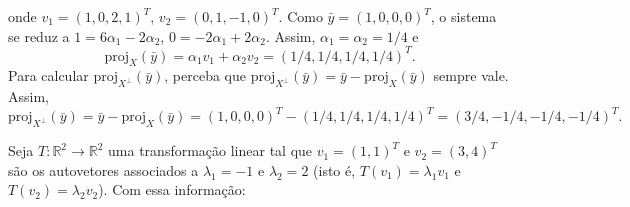\documentclass[11pt]{exam}
\begin{document}
\begin{questions}
\begin{parts}
\begin{solution}
         onde $v_1=(1, 0, 2, 1)^{T}$, $v_2=(0, 1, -1, 0)^{T}$.
         Como $\bar{y}=(1,0,0,0)^{T}$, o sistema se reduz a 
         $1=6\alpha_1-2\alpha_2$, $0=-2\alpha_1+2\alpha_2$. Assim, $\alpha_1=\alpha_2=1/4$
         e $$\text{proj}_{X}(\bar{y})=\alpha_1v_1+\alpha_2v_2=(1/4, 1/4, 1/4, 1/4)^{T}.$$
         Para calcular $\text{proj}_{X^{\perp}}(\bar{y})$, perceba que 
         $\text{proj}_{X^{\perp}}(\bar{y})=\bar{y}-\text{proj}_{X}(\bar{y})$ sempre vale. Assim, 
         $$\text{proj}_{X^{\perp}}(\bar{y})=\bar{y}-\text{proj}_{X}(\bar{y})=
         (1,0, 0,0)^{T}-(1/4, 1/4, 1/4, 1/4)^{T}=(3/4, -1/4, -1/4, -1/4)^{T}.$$
         \end{solution}
     \end{parts}   
  \question
  Seja $T:\mathbb{R}^{2}\rightarrow \mathbb{R}^{2}$
  uma transformação linear tal que 
  $v_{1}=(1, 1)^{T}$ e $v_{2}=(3, 4)^{T}$ são os autovetores associados 
  a $\lambda_{1}=-1$ e $\lambda_2=2$ (isto é, $T(v_1)=\lambda_1 v_1$ 
  e $T(v_2)=\lambda_2 v_2$). Com essa informação:
\end{questions}
\end{document}
